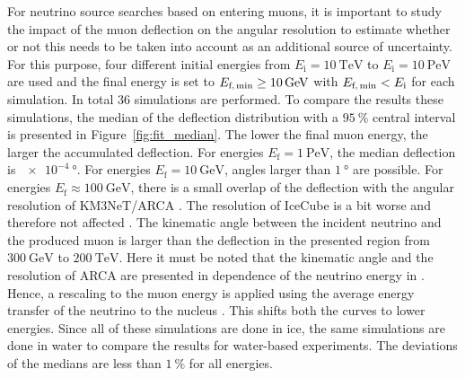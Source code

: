\documentclass[pdflatex, sn-mathphys]{sn-jnl}%
\theoremstyle{thmstyleone}%
\theoremstyle{thmstyletwo}%
\theoremstyle{thmstylethree}%
\begin{document}
For neutrino source searches based on entering muons, it is important to study the impact of the muon 
deflection on the angular resolution to estimate whether or not this needs to be 
taken into account as an additional source of uncertainty.
For this purpose, four different initial energies 
from $E_{\text{i}} = \SI{10}{\tera\electronvolt}$ to 
$E_{\text{i}} = \SI{10}{\peta\electronvolt}$ are used and the final 
energy is set to $E_{\text{f,\,min}} \geq \SI{10}{\giga\electronvolt}$ with 
$E_{\text{f,\,min}} < E_{\text{i}}$ for each simulation. 
In total $\num{36}$ simulations are performed. 
To compare the results these simulations, the median of the deflection distribution 
with a $\SI{95}{\percent}$ central interval is presented in 
Figure~\ref{fig:fit_median}.
The lower the final muon energy, the larger the accumulated deflection. 
For energies $E_{\text{f}} = \SI{1}{\peta\electronvolt}$, the median deflection 
is $\SI{e-4}{\degree}$. For energies $E_{\text{f}} = \SI{10}{\giga\electronvolt}$, 
angles larger than $\SI{1}{\degree}$ are possible. For energies  
$E_{\text{f}} \approx \SI{100}{\giga\electronvolt}$, 
there is a small overlap of the deflection with the angular resolution of KM3NeT/ARCA 
\cite{KM3NeT_Resolution2016, KM3NeT_Resolution2021}. The resolution of IceCube is a bit worse and 
therefore not affected \cite{IceCube_Resolution2021}. 
The kinematic angle between the incident neutrino and the produced muon is 
larger than the deflection in the presented region from $\SI{300}{\giga\electronvolt}$
to $\SI{200}{\tera\electronvolt}$. Here it must be noted that the kinematic angle 
and the resolution of ARCA are presented in dependence of the neutrino energy 
in \cite{KM3NeT_Resolution2016, KM3NeT_Resolution2021}. Hence, a rescaling to the muon energy is applied using the average energy transfer of the neutrino to 
the nucleus \cite{GANDHI199681}. This shifts both the curves to lower energies. 
Since all of these simulations are done 
in ice, the same simulations are done in water to compare the results for 
water-based experiments. The deviations of the medians
are less than $\SI{1}{\percent}$ for all energies.
\end{document}
